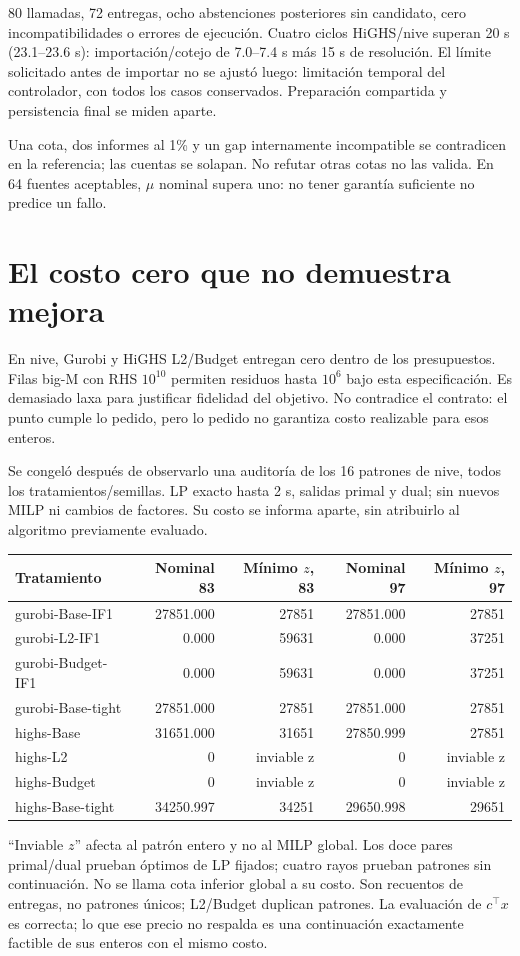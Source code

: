 \documentclass[10pt,a4paper]{article}
\begin{document}
80 llamadas, 72 entregas, ocho abstenciones posteriores sin candidato,
cero incompatibilidades o errores de ejecución. Cuatro ciclos HiGHS/nive
superan 20 s (23.1--23.6 s): importación/cotejo de 7.0--7.4 s más 15 s
de resolución. El límite solicitado antes de importar no se ajustó luego:
limitación temporal del controlador, con todos los casos conservados.
Preparación compartida y persistencia final se miden aparte.

Una cota, dos informes al 1\% y un gap internamente incompatible se
contradicen en la referencia; las cuentas se solapan. No refutar otras cotas
no las valida. En 64 fuentes aceptables, $\mu$ nominal supera uno: no tener
garantía suficiente no predice un fallo.
\section*{El costo cero que no demuestra mejora}
En nive, Gurobi y HiGHS L2/Budget entregan cero dentro de los presupuestos.
Filas big-M con RHS $10^{10}$ permiten residuos hasta $10^6$ bajo esta
especificación. Es demasiado laxa para justificar fidelidad del objetivo.
No contradice el contrato: el punto cumple lo pedido, pero lo pedido no
garantiza costo realizable para esos enteros.

Se congeló después de observarlo una auditoría de los 16 patrones de nive,
todos los tratamientos/semillas. LP exacto hasta 2 s, salidas primal y dual;
sin nuevos MILP ni cambios de factores. Su costo se informa aparte, sin
atribuirlo al algoritmo previamente evaluado.
\begin{center}\small\begin{tabular}{@{}lrrrr@{}}\toprule
Tratamiento & Nominal 83 & Mínimo $z$, 83 & Nominal 97 & Mínimo $z$, 97\\\midrule
gurobi-Base-IF1 & 27851.000 & 27851 & 27851.000 & 27851\\
gurobi-L2-IF1 & 0.000 & 59631 & 0.000 & 37251\\
gurobi-Budget-IF1 & 0.000 & 59631 & 0.000 & 37251\\
gurobi-Base-tight & 27851.000 & 27851 & 27851.000 & 27851\\
highs-Base & 31651.000 & 31651 & 27850.999 & 27851\\
highs-L2 & 0 & inviable z & 0 & inviable z\\
highs-Budget & 0 & inviable z & 0 & inviable z\\
highs-Base-tight & 34250.997 & 34251 & 29650.998 & 29651\\
\bottomrule\end{tabular}\end{center}
``Inviable $z$'' afecta al patrón entero y no al MILP global. Los doce
pares primal/dual prueban óptimos de LP fijados; cuatro rayos prueban
patrones sin continuación. No se llama cota inferior global a su costo.
Son recuentos de entregas, no patrones únicos; L2/Budget duplican patrones.
La evaluación de $c^\top x$ es correcta; lo que ese precio no respalda
es una continuación exactamente factible de sus enteros con el mismo costo.
\newpage
\end{document}
